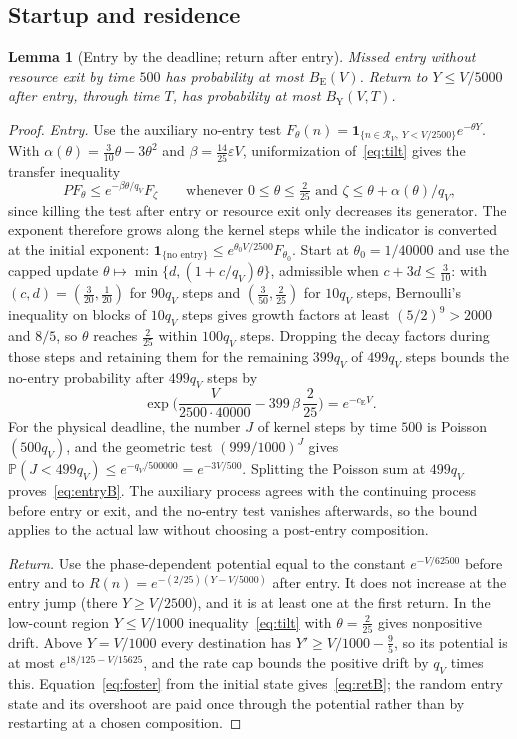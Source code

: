 \documentclass[11pt,a4paper]{article}
\theoremstyle{plain}
\newtheorem{lemma}[theorem]{Lemma}
\theoremstyle{definition}
\theoremstyle{remark}
\newcommand{\Prob}{\mathbb P}
\newcommand{\R}{\mathcal R_V}
\newcommand{\ind}{\mathbf 1}
\newcommand{\eps}{\varepsilon}
\newcommand{\cE}{c_{\mathrm E}}
\newcommand{\BE}{B_{\mathrm E}}
\newcommand{\BY}{B_{\mathrm Y}}
\begin{document}
\subsection{Startup and residence}
\begin{lemma}[Entry by the deadline; return after entry]\label{lem:entryreturn}
Missed entry without resource exit by time $500$ has probability at most $\BE(V)$. Return to $Y\le V/5000$ after entry, through time $T$, has probability at most $\BY(V,T)$.
\end{lemma}
\begin{proof}
\emph{Entry.} Use the auxiliary no-entry test
$F_\theta(n)=\ind_{\{n\in\R,\ Y<V/2500\}}e^{-\theta Y}$.
With $\alpha(\theta)=\frac3{10}\theta-3\theta^2$ and $\beta=\frac{14}{25}\eps V$, uniformization of~\eqref{eq:tilt} gives the transfer inequality
\begin{equation}\label{eq:transfer}
 PF_\theta\le e^{-\beta\theta/q_V}F_\zeta\qquad\text{whenever }0\le\theta\le\tfrac2{25}\text{ and }\zeta\le\theta+\alpha(\theta)/q_V,
\end{equation}
since killing the test after entry or resource exit only decreases its generator. The exponent therefore grows along the kernel steps while the indicator is converted at the initial exponent: $\ind_{\{\text{no entry}\}}\le e^{\theta_0V/2500}F_{\theta_0}$. Start at $\theta_0=1/40000$ and use the capped update $\theta\mapsto\min\{d,(1+c/q_V)\theta\}$, admissible when $c+3d\le\frac3{10}$: with $(c,d)=(\frac3{20},\frac1{20})$ for $90q_V$ steps and $(\frac3{50},\frac2{25})$ for $10q_V$ steps, Bernoulli's inequality on blocks of $10q_V$ steps gives growth factors at least $(5/2)^9>2000$ and $8/5$, so $\theta$ reaches $\frac2{25}$ within $100q_V$ steps. Dropping the decay factors during those steps and retaining them for the remaining $399q_V$ of $499q_V$ steps bounds the no-entry probability after $499q_V$ steps by
\[
 \exp\Big(\frac V{2500\cdot40000}-399\,\beta\,\frac2{25}\Big)=e^{-\cE V}.
\]
For the physical deadline, the number $J$ of kernel steps by time $500$ is Poisson$(500q_V)$, and the geometric test $(999/1000)^J$ gives $\Prob(J<499q_V)\le e^{-q_V/500000}=e^{-3V/500}$. Splitting the Poisson sum at $499q_V$ proves~\eqref{eq:entryB}. The auxiliary process agrees with the continuing process before entry or exit, and the no-entry test vanishes afterwards, so the bound applies to the actual law without choosing a post-entry composition.

\emph{Return.} Use the phase-dependent potential equal to the constant $e^{-V/62500}$ before entry and to $R(n)=e^{-(2/25)(Y-V/5000)}$ after entry. It does not increase at the entry jump (there $Y\ge V/2500$), and it is at least one at the first return. In the low-count region $Y\le V/1000$ inequality~\eqref{eq:tilt} with $\theta=\frac2{25}$ gives nonpositive drift. Above $Y=V/1000$ every destination has $Y'\ge V/1000-\frac95$, so its potential is at most $e^{18/125-V/15625}$, and the rate cap bounds the positive drift by $q_V$ times this. Equation~\eqref{eq:foster} from the initial state gives~\eqref{eq:retB}; the random entry state and its overshoot are paid once through the potential rather than by restarting at a chosen composition.
\end{proof}
\end{document}

